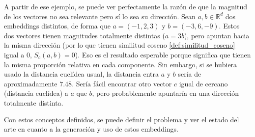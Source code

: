 A partir de ese ejemplo, se puede ver perfectamente la razón de que la magnitud de los vectores no sea relevante pero sí lo sea su dirección. Sean $a,b\in\mathbb{R}^d$ dos embeddings
distintos, de forma que $a=(-1, 2, 3)$ y $b=(-3, 6, -9)$. Estos dos vectores tienen magnitudes totalmente distintas ($a=3b$), pero apuntan hacia la misma dirección
(por lo que tienen similitud coseno \ref{def:similitud_coseno} igual a 0, $S_c(a,b)=0$). Eso es el resultado esperable porque significa que tienen la misma proporción relativa en cada componente.
Sin embargo, si se hubiera usado la distancia euclídea usual, la distancia entra $a$ y $b$ sería de aproximadamente $7.48$. Sería fácil encontrar otro vector $c$ igual de cercano (distancia euclídea) a $a$
que $b$, pero probablemente apuntaría en una dirección totalmente distinta.

Con estos conceptos definidos, se puede definir el problema y ver el estado del arte en cuanto a la generación y uso de estos embeddings.